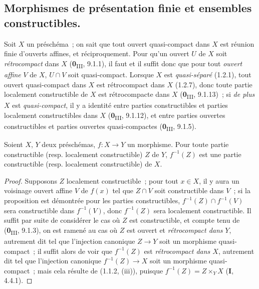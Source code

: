 \subsection{Morphismes de présentation finie et ensembles constructibles.}
\label{subsection:IV.1.8-fr}

\begin{env}[1.8.1]
\label{IV.1.8.1-fr}
Soit $X$ un préschéma~; on sait que tout ouvert quasi-compact dans $X$ est
réunion finie d'ouverts affines, et réciproquement. Pour qu'un ouvert $U$ de
$X$ soit \emph{rétrocompact} dans $X$ (\textbf{0}\textsubscript{III}, 9.1.1), il faut
et il suffit donc que pour tout \emph{ouvert affine} $V$ de $X$, $U\cap V$
soit quasi-compact. Lorsque $X$ est \emph{quasi-séparé} (1.2.1), tout ouvert
quasi-compact dans $X$ est rétrocompact dans $X$ (1.2.7), donc toute partie
localement constructible de $X$ est rétrocompacte dans $X$
(\textbf{0}\textsubscript{III}, 9.1.13)~; si \emph{de plus} $X$ est
\emph{quasi-compact}, il y a identité entre parties constructibles et parties
localement constructibles dans $X$ (\textbf{0}\textsubscript{III}, 9.1.12), et entre
parties ouvertes constructibles et parties ouvertes quasi-compactes
(\textbf{0}\textsubscript{III}, 9.1.5).
\end{env}

\begin{proposition}[1.8.2]
\label{IV.1.8.2-fr}
Soient $X$, $Y$ deux préschémas, $f:X\to Y$ un morphisme. Pour toute partie
constructible (\textup{resp.} localement constructible) $Z$ de $Y$, $f^{-1}(Z)$ est
une partie constructible (\textup{resp.} localement constructible) de $X$.
\end{proposition}

\begin{proof}
Supposons $Z$ localement constructible~; pour tout $x\in X$, il y aura un
voisinage ouvert affine $V$ de $f(x)$ tel que $Z\cap V$ soit constructible
dans $V$~; si la proposition est démontrée pour les parties constructibles,
$f^{-1}(Z)\cap f^{-1}(V)$ sera constructible dans $f^{-1}(V)$, donc
$f^{-1}(Z)$ sera localement constructible. Il suffit par suite de considérer
le cas où $Z$ est constructible, et compte tenu de (\textbf{0}\textsubscript{III},
9.1.3), on est ramené au cas où $Z$ est ouvert et \emph{rétrocompact dans}
$Y$, autrement dit tel que l'injection canonique $Z\to Y$ soit un morphisme
quasi-compact~; il suffit alors de voir que $f^{-1}(Z)$ est
\emph{rétrocompact dans $X$}, autrement dit tel que l'injection canonique
$f^{-1}(Z)\to X$ soit un morphisme quasi-compact~; mais cela résulte de
(1.1.2, (iii)), puisque $f^{-1}(Z)=Z\times_YX$ (\textbf{I}, 4.4.1).
\end{proof}

